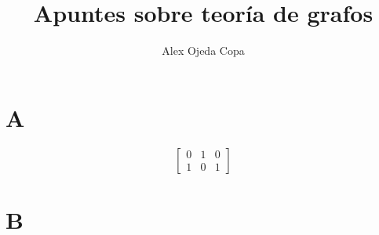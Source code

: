 \documentclass{article}
\title{Apuntes sobre teoría de grafos}
\author{Alex Ojeda Copa}
\begin{document}
\maketitle

\section{A}

\begin{equation}
    \begin{bmatrix}
        0 & 1 & 0  \\
        1 & 0 & 1
    \end{bmatrix}    
\end{equation}


\section{B}
\end{document}
